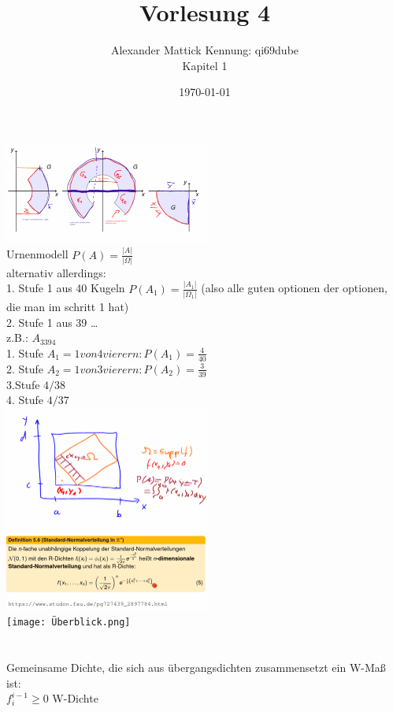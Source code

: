 \documentclass{article}
\author{
Alexander Mattick Kennung: qi69dube\\
Kapitel 1
}
\date{\today}
\title{Vorlesung 4}
\begin{document}
	\maketitle
	\includegraphics[width=256px]{projezierbarkeit.png}\\
	Urnenmodell $P(A)=\frac{|A|}{|\Omega|}$\\
	alternativ allerdings:\\
	1. Stufe 1 aus 40 Kugeln $P(A_1)=\frac{|A_1|}{|\Omega_1|}$ (also alle guten optionen der optionen, die man im schritt 1 hat)\\
	2. Stufe 1 aus 39 \dots\\
	z.B.: $A_{3394}$\\
	1. Stufe $A_1= 1 von 4 vierern: P(A_1)=\frac{4}{40}$\\
	2. Stufe $A_2= 1 von 3 vierern: P(A_2)=\frac{3}{39}$\\
	3.Stufe $4/38$\\
	4. Stufe $4/37$\\
	\includegraphics[width=256px]{probsupport.png}\\
	\includegraphics[width=256px]{NormalverteilInN_Dim.png}\\
	\texttt{[image: Überblick.png]}\\
	\\\\
	Gemeinsame Dichte, die sich aus übergangsdichten zusammensetzt ein W-Maß ist:\\
	$f^{i-1}_i \geq 0$ W-Dichte\\
\end{document}
